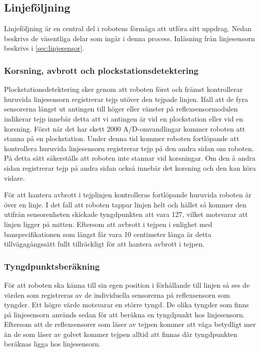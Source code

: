 \subsection{Linjeföljning}
Linjeföljning är en central del i robotens förmåga att utföra sitt uppdrag. Nedan beskrivs de väsentliga delar som ingår i denna process. Inläsning från linjesensorn beskrivs i \ref{sec:linjesensor}.

\subsubsection{Korsning, avbrott och plockstationsdetektering}

Plockstationsdetektering sker genom att roboten först och främst kontrollerar huruvida linjesensorn registrerar tejp utöver den tejpade linjen. Ifall att de fyra sensorerna längst ut antingen till höger eller vänster på reflexsensormodulen indikerar tejp innebär detta att vi antingen är vid en plockstation eller vid en korsning. Först när det har skett 2000 A/D-omvandlingar kommer roboten att stanna på en plockstation. Under denna tid kommer roboten fortlöpande att kontrollera huruvida linjesensorn registrerar tejp på den andra sidan om roboten. På detta sätt säkerställs att roboten inte stannar vid korsningar. Om den å andra sidan registrerar tejp på andra sidan också innebär det korsning och den kan köra vidare. 

För att hantera avbrott i tejplinjen kontrolleras fortlöpande huruvida roboten är över en linje. I det fall att roboten tappar linjen helt och hållet så kommer den utifrån sensorenheten skickade tyngdpunkten att vara 127, vilket motsvarar att linjen ligger på mitten. Eftersom att avbrott i tejpen i enlighet med banspecifikationen som längst får vara 10 centimeter långa är detta tillvägagångssätt fullt tillräckligt för att hantera avbrott i tejpen.
 


\subsubsection{Tyngdpunktsberäkning}
För att roboten ska känna till sin egen position i förhållande till linjen så ses de värden som registreras av de individuella sensorerna på reflexsensorn som tyngder. Ett högre värde motsvarar en större tyngd. De olika tyngder som finns på linjesensorn används sedan för att beräkna en tyngdpunkt hos linjesensorn. Eftersom att de reflexsensorer som läser av tejpen kommer att väga betydligt mer än de som läser av golvet kommer tejpen alltid att finnas där tyngdpunkten beräknas ligga hos linjesensorn.

